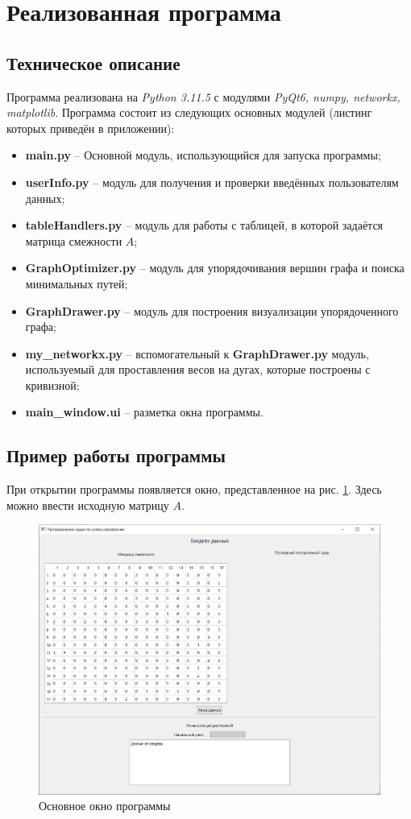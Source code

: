 	\section{Реализованная программа}
	
	\subsection{Техническое описание}
	
	Программа реализована на \textit{Python 3.11.5} с модулями \textit{PyQt6, numpy, networkx, matplotlib}. Программа состоит из следующих основных модулей (листинг которых приведён в приложении):
	\begin{itemize}
		\item \textbf{main.py} -- Основной модуль, использующийся для запуска программы;
		\item \textbf{userInfo.py} -- модуль для получения и проверки введённых пользователям данных;
		\item \textbf{tableHandlers.py} -- модуль для работы с таблицей, в которой задаётся матрица смежности $A$;
		\item \textbf{GraphOptimizer.py} -- модуль для упорядочивания вершин графа и поиска минимальных путей;
		\item \textbf{GraphDrawer.py} -- модуль для построения визуализации упорядоченного графа;
		\item \textbf{my\_networkx.py} -- вспомогательный к \textbf{GraphDrawer.py} модуль, используемый для проставления весов на дугах, которые построены с кривизной;
		\item \textbf{main\_window.ui} -- разметка окна программы.
	\end{itemize}
	
	\subsection{Пример работы программы}
	
	При открытии программы появляется окно, представленное на рис. \ref{screen1}. Здесь можно ввести исходную матрицу $A$. 
	
	\begin{figure}[h]
		\centering\includegraphics[width=.65\textwidth]{png/screen1.png}
		\caption{Основное окно программы}
		\label{screen1}
	\end{figure}
	
